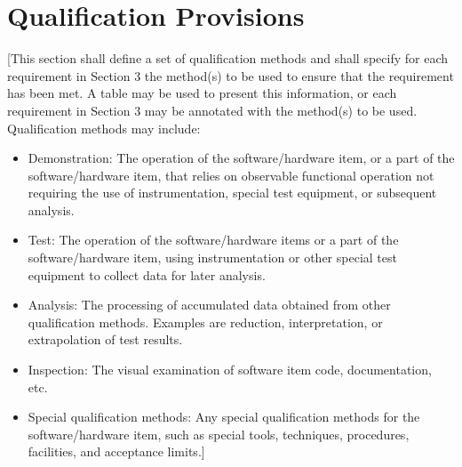 \chapter{Qualification Provisions\label{ref-031}}

[This section shall define a set of qualification methods and shall specify for each requirement in Section 3 the method(s) to be used to ensure that the requirement has been met. A table may be used to present this information, or each requirement in Section 3 may be annotated with the method(s) to be used. Qualification methods may include:

\begin{itemize}
\item Demonstration: The operation of the software/hardware item, or a part of the software/hardware item, that relies on observable functional operation not requiring the use of instrumentation, special test equipment, or subsequent analysis.

\item Test: The operation of the software/hardware items or a part of the software/hardware item, using instrumentation or other special test equipment to collect data for later analysis.

\item Analysis: The processing of accumulated data obtained from other qualification methods. Examples are reduction, interpretation, or extrapolation of test results.

\item Inspection: The visual examination of software item code, documentation, etc.

\item Special qualification methods: Any special qualification methods for the software/hardware item, such as special tools, techniques, procedures, facilities, and acceptance limits.]

\end{itemize}
